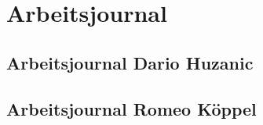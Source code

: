 \chapter{Arbeitsjournal}

\section{Arbeitsjournal Dario Huzanic}



\newpage

\section{Arbeitsjournal Romeo Köppel}

